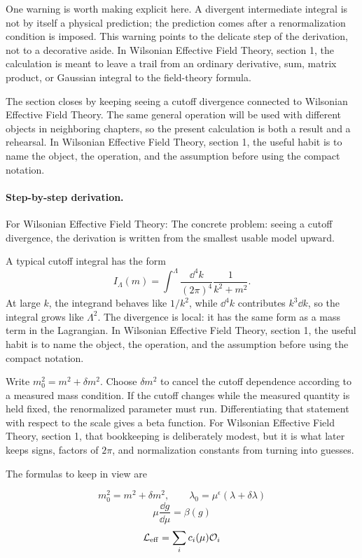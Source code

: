 One warning is worth making explicit here.  A divergent intermediate integral is not by itself a physical prediction; the prediction comes after a renormalization condition is imposed.  This warning points to the delicate step of the derivation, not to a decorative aside.  In Wilsonian Effective Field Theory, section 1, the calculation is meant to leave a trail from an ordinary derivative, sum, matrix product, or Gaussian integral to the field-theory formula.

The section closes by keeping seeing a cutoff divergence connected to Wilsonian Effective Field Theory.  The same general operation will be used with different objects in neighboring chapters, so the present calculation is both a result and a rehearsal.  In Wilsonian Effective Field Theory, section 1, the useful habit is to name the object, the operation, and the assumption before using the compact notation.



\paragraph{Step-by-step derivation.}

For Wilsonian Effective Field Theory: The concrete problem: seeing a cutoff divergence, the derivation is written from the smallest usable model upward.

A typical cutoff integral has the form
\[
  I_\Lambda(m)=\int^{\Lambda}\frac{\dd^4k}{(2\pi)^4}\frac{1}{k^2+m^2}.
\]
At large \(k\), the integrand behaves like \(1/k^2\), while \(\dd^4k\) contributes \(k^3\dd k\), so the integral grows like \(\Lambda^2\).  The divergence is local: it has the same form as a mass term in the Lagrangian.  In Wilsonian Effective Field Theory, section 1, the useful habit is to name the object, the operation, and the assumption before using the compact notation.

Write \(m_0^2=m^2+\delta m^2\).  Choose \(\delta m^2\) to cancel the cutoff dependence according to a measured mass condition.  If the cutoff changes while the measured quantity is held fixed, the renormalized parameter must run.  Differentiating that statement with respect to the scale gives a beta function.  For Wilsonian Effective Field Theory, section 1, that bookkeeping is deliberately modest, but it is what later keeps signs, factors of \(2\pi\), and normalization constants from turning into guesses.

The formulas to keep in view are

\[
  m_0^2=m^2+\delta m^2,\qquad \lambda_0=\mu^\epsilon(\lambda+\delta\lambda)
\]
\[
  \mu\frac{\dd g}{\dd\mu}=\beta(g)
\]
\[
  \mathcal L_{\mathrm{eff}}=\sum_i c_i(\mu)\mathcal O_i
\]

